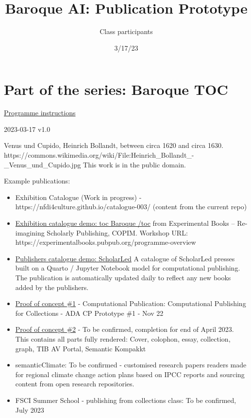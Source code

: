 \documentclass[
  letterpaper,
]{book}
\title{Baroque AI: Publication Prototype}
\author{Class participants}
\date{3/17/23}
\renewcommand*\contentsname{Table of contents}
\newcommand\contentsname{Table of contents}
\begin{document}
\frontmatter
\maketitle
\ifdefined\Shaded\renewenvironment{Shaded}{\begin{tcolorbox}[interior hidden, boxrule=0pt, borderline west={3pt}{0pt}{shadecolor}, sharp corners, enhanced, breakable, frame hidden]}{\end{tcolorbox}}\fi

\renewcommand*\contentsname{Table of contents}
{
\setcounter{tocdepth}{2}
\tableofcontents
}
\mainmatter
{}

\hypertarget{part-of-the-series-baroque-toc}{%
\chapter{Part of the series: Baroque
TOC}\label{part-of-the-series-baroque-toc}}

\href{https://nfdi4culture.github.io/class-ADA-CP-pipeline/}{Programme
instructions}

2023-03-17 v1.0

Venus und Cupido, Heinrich Bollandt, between circa 1620 and circa 1630.
https://commons.wikimedia.org/wiki/File:Heinrich\_Bollandt\_-\_Venus\_und\_Cupido.jpg
This work is in the public domain.

Example publications:

\begin{itemize}
\item
  Exhibition Catalogue (Work in progress) -
  https://nfdi4culture.github.io/catalogue-003/ (content from the
  current repo)
\item
  \href{https://nfdi4culture.github.io/experimental-books-workshop/}{Exhibition
  catalogue demo: toc Baroque /toc} from Experimental Books --
  Re-imagining Scholarly Publishing, COPIM. Workshop URL:
  https://experimentalbooks.pubpub.org/programme-overview
\item
  \href{https://simonxix.github.io/scholarled_catalogue/}{Publishers
  catalogue demo: ScholarLed} A catalogue of ScholarLed presses built on
  a Quarto / Jupyter Notebook model for computational publishing. The
  publication is automatically updated daily to reflect any new books
  added by the publishers.
\item
  \href{https://nfdi4culture.github.io/cp4c/}{Proof of concept \#1} -
  Computational Publication: Computational Publishing for Collections -
  ADA CP Prototype \#1 - Nov 22
\item
  \href{https://nfdi4culture.github.io/art_catalogue_test/}{Proof of
  concept \#2} - To be confirmed, completion for end of April 2023. This
  contains all parts fully rendered: Cover, colophon, essay, collection,
  graph, TIB AV Portal, Semantic Kompakkt
\item
  semanticClimate: To be confirmed - customised research papers readers
  made for regional climate change action plans based on IPCC reports
  and sourcing content from open research repositories.
\item
  FSCI Summer School - publishing from collections class: To be
  confirmed, July 2023
\end{itemize}
\end{document}
